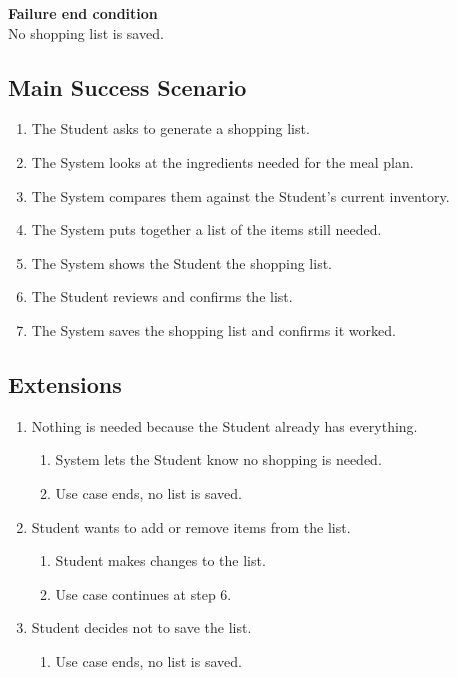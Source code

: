 \documentclass[10pt,letterpaper]{article}
\begin{document}
\textbf{Failure end condition}\\
No shopping list is saved.

\subsection*{Main Success Scenario}
\begin{enumerate}
    \item The Student asks to generate a shopping list.
    \item The System looks at the ingredients needed for the meal plan.
    \item The System compares them against the Student's current inventory.
    \item The System puts together a list of the items still needed.
    \item The System shows the Student the shopping list.
    \item The Student reviews and confirms the list.
    \item The System saves the shopping list and confirms it worked.
\end{enumerate}

\subsection*{Extensions}
\begin{enumerate}
    \item[4a.] Nothing is needed because the Student already has everything.
    \begin{enumerate}
        \item[1.] System lets the Student know no shopping is needed.
        \item[2.] Use case ends, no list is saved.
    \end{enumerate}
    \item[6a.] Student wants to add or remove items from the list.
    \begin{enumerate}
        \item[1.] Student makes changes to the list.
        \item[2.] Use case continues at step 6.
    \end{enumerate}
    \item[6b.] Student decides not to save the list.
    \begin{enumerate}
        \item[1.] Use case ends, no list is saved.
    \end{enumerate}
\end{enumerate}
\end{document}
